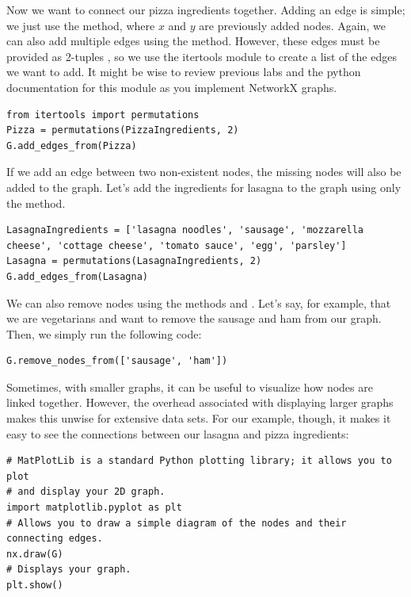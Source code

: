 Now we want to connect our pizza ingredients together. Adding an edge is simple; we just use the  method, where $x$ and $y$ are previously added nodes.
Again, we can also add multiple edges using the  method.
However, these edges must be provided as 2-tuples , so we use the
itertools module to create a list of the edges we want to add. It might be wise
to review previous labs and the python documentation for this module as you implement
NetworkX graphs.

\begin{lstlisting}
from itertools import permutations
Pizza = permutations(PizzaIngredients, 2)
G.add_edges_from(Pizza)
\end{lstlisting}
If we add an edge between two non-existent nodes, the missing nodes will also be added to the graph. Let's add the ingredients for lasagna to the graph using only the  method.
\begin{lstlisting}
LasagnaIngredients = ['lasagna noodles', 'sausage', 'mozzarella cheese', 'cottage cheese', 'tomato sauce', 'egg', 'parsley']
Lasagna = permutations(LasagnaIngredients, 2)
G.add_edges_from(Lasagna)
\end{lstlisting}
We can also remove nodes using the methods  and .
Let's say, for example, that we are vegetarians and want to remove the
sausage and ham from our graph. Then, we simply run the following code:
\begin{lstlisting}
G.remove_nodes_from(['sausage', 'ham'])
\end{lstlisting}

Sometimes, with smaller graphs, it can be useful to visualize how nodes are linked together. However, the overhead associated with displaying larger graphs makes this unwise for extensive data sets.
For our example, though, it makes it easy to see the connections between our lasagna and pizza ingredients:

\begin{lstlisting}
# MatPlotLib is a standard Python plotting library; it allows you to plot
# and display your 2D graph.
import matplotlib.pyplot as plt
# Allows you to draw a simple diagram of the nodes and their connecting edges.
nx.draw(G)
# Displays your graph.
plt.show()
\end{lstlisting}


